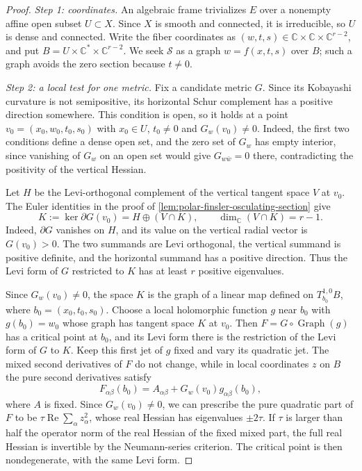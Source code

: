 \begin{proof}
\emph{Step 1: coordinates.} An algebraic frame trivializes $E$ over a nonempty affine open subset $U\subset X$. Since $X$ is smooth and connected, it is irreducible, so $U$ is dense and connected. Write the fiber coordinates as $(w,t,s)\in\mathbb C\times\mathbb C\times\mathbb C^{r-2}$, and put $B=U\times\mathbb C^*\times\mathbb C^{r-2}$. We seek $\mathcal S$ as a graph $w=f(x,t,s)$ over $B$; such a graph avoids the zero section because $t\ne0$.

\emph{Step 2: a local test for one metric.} Fix a candidate metric $G$. Since its Kobayashi curvature is not semipositive, its horizontal Schur complement has a positive direction somewhere. This condition is open, so it holds at a point $v_0=(x_0,w_0,t_0,s_0)$ with $x_0\in U$, $t_0\neq0$ and $G_w(v_0)\neq0$. Indeed, the first two conditions define a dense open set, and the zero set of $G_w$ has empty interior, since vanishing of $G_w$ on an open set would give $G_{w\bar w}=0$ there, contradicting the positivity of the vertical Hessian.

Let $H$ be the Levi-orthogonal complement of the vertical tangent space $V$ at $v_0$. The Euler identities in the proof of \cref{lem:polar-finsler-osculating-section} give
\[
 K:=\ker\partial G(v_0)=H\oplus(V\cap K),
 \qquad \dim_{\mathbb C}(V\cap K)=r-1.
\]
Indeed, $\partial G$ vanishes on $H$, and its value on the vertical radial vector is $G(v_0)>0$. The two summands are Levi orthogonal, the vertical summand is positive definite, and the horizontal summand has a positive direction. Thus the Levi form of $G$ restricted to $K$ has at least $r$ positive eigenvalues.

Since $G_w(v_0)\neq0$, the space $K$ is the graph of a linear map defined on $T_{b_0}^{1,0}B$, where $b_0=(x_0,t_0,s_0)$. Choose a local holomorphic function $g$ near $b_0$ with $g(b_0)=w_0$ whose graph has tangent space $K$ at $v_0$. Then $F=G\circ\operatorname{Graph}(g)$ has a critical point at $b_0$, and its Levi form there is the restriction of the Levi form of $G$ to $K$. Keep this first jet of $g$ fixed and vary its quadratic jet. The mixed second derivatives of $F$ do not change, while in local coordinates $z$ on $B$ the pure second derivatives satisfy
\[
 F_{\alpha\beta}(b_0)=A_{\alpha\beta}+G_w(v_0)g_{\alpha\beta}(b_0),
\]
where $A$ is fixed. Since $G_w(v_0)\ne0$, we can prescribe the pure quadratic part of $F$ to be $\tau\operatorname{Re}\sum_\alpha z_\alpha^2$, whose real Hessian has eigenvalues $\pm2\tau$. If $\tau$ is larger than half the operator norm of the real Hessian of the fixed mixed part, the full real Hessian is invertible by the Neumann-series criterion. The critical point is then nondegenerate, with the same Levi form.


\end{proof}
